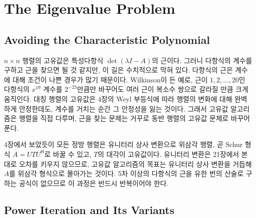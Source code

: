 \chapter{The Eigenvalue Problem}
\label{ch:eigenvalues}


\section{Avoiding the Characteristic Polynomial}
\label{sec:why-not-poly}

$n\times n$ 행렬의 고유값은 특성다항식 $\det(\lambda I-A)$의 근이다. 그러니 다항식의 계수를 구하고 근을 찾으면 될 것 같지만, 이 길은 수치적으로 막혀 있다. 다항식의 근은 계수에 대해 조건이 나쁜 경우가 많기 때문이다. Wilkinson이 든 예로, 근이 $1,2,\dots,20$인 다항식의 $x^{19}$ 계수를 $2^{-23}$만큼만 바꾸어도 여러 근이 복소수 쌍으로 갈라질 만큼 크게 움직인다\cite{wilkinson1965aep}. 대칭 행렬의 고유값은 4장의 Weyl 부등식에 따라 행렬의 변화에 대해 완벽하게 안정한데도, 계수를 거치는 순간 그 안정성을 잃는 것이다. 그래서 고유값 알고리즘은 행렬을 직접 다루며, 근을 찾는 문제는 거꾸로 동반 행렬의 고유값 문제로 바꾸어 푼다.

4장에서 보았듯이 모든 정방 행렬은 유니터리 상사 변환으로 위삼각 행렬, 곧 Schur 형식 $A=UTU^{\mathsf H}$로 바꿀 수 있고, $T$의 대각이 고유값이다. 유니터리 변환은 21장에서 본 대로 오차를 키우지 않으므로, 고유값 알고리즘의 목표는 유니터리 상사 변환을 거듭해 $A$를 위삼각 형식으로 몰아가는 것이다. 5차 이상의 다항식의 근을 유한 번의 산술로 구하는 공식이 없으므로 이 과정은 반드시 반복이어야 한다.

\section{Power Iteration and Its Variants}
\label{sec:power}

